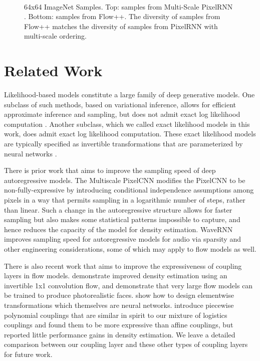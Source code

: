 \documentclass{article}
\begin{document}
\begin{figure}[h]
\centering
{}\\
\caption{64x64 ImageNet Samples. Top: samples from Multi-Scale PixelRNN \citep{oord2016pixel}. Bottom: samples from Flow++. The diversity of samples from Flow++ matches the diversity of samples from PixelRNN with multi-scale ordering.}
\label{fig:imagenet-samples-64}
\end{figure}


\section{Related Work}

Likelihood-based models constitute a large family of deep generative models. One subclass of such methods, based on variational inference, allows for efficient approximate inference and sampling, but does not admit exact log likelihood computation \citep{kingma2013auto, rezende2014stochastic, kingma2016improving}.
Another subclass, which we called exact likelihood models in this work, does admit exact log likelihood computation. These exact likelihood models are typically specified as invertible transformations that are parameterized by neural networks \citep{deco1995higher,larochelle2011neural,uria2013rnade,dinh2014nice,germain2015made,oord2016pixel,salimans2017pixelcnn++,chen2017pixelsnail}.

There is prior work that aims to improve the sampling speed of deep autoregressive models. The Multiscale PixelCNN \citep{reed2017parallel} modifies the PixelCNN to be non-fully-expressive by introducing conditional independence assumptions among pixels in a way that permits sampling in a logarithmic number of steps, rather than linear. Such a change in the autoregressive structure allows for faster sampling but also makes some statistical patterns impossible to capture, and hence reduces the capacity of the model for density estimation. WaveRNN \citep{kalchbrenner2018efficient} improves sampling speed for autoregressive models for audio via sparsity and other engineering considerations, some of which may apply to flow models as well.

There is also recent work that aims to improve the expressiveness of coupling layers in flow models.
\citet{kingma2018glow} demonstrate improved density estimation using an invertible 1x1 convolution flow, and demonstrate that very large flow models can be trained to produce photorealistic faces. 
\citet{huang2018neural} show how to design elementwise transformations which themselves are neural networks. \citet{muller2018neural} introduce piecewise polynomial couplings that are similar in spirit to our mixture of logistics couplings and found them to be more expressive than affine couplings, but reported little performance gains in density estimation. We leave a detailed comparison between our coupling layer and these other types of coupling layers for future work.
\end{document}
